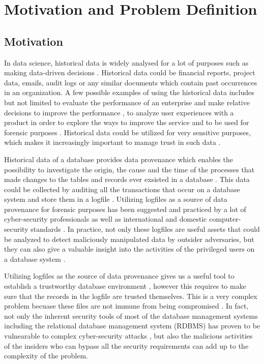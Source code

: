 \chapter{Motivation and Problem Definition} \label{ch:motivation}

	\section{Motivation} \label{sec:motivation}
		In data science, historical data is widely analysed for a lot of purposes such as making data-driven decisions \cite{rose2016datascience}. Historical data could be financial reports, project data, emails, audit logs or any similar documents which contain past occurrences in an organization. A few possible examples of using the historical data includes but not limited to evaluate the performance of an enterprise and make relative decisions to improve the performance \cite{ghasemaghaei2015impactsOB}, to analyze user experiences with a product in order to explore the ways to improve the service \cite{klein2013analysis} and to be used for forensic purposes \cite{wagner2018detect}. Historical data could be utilized for very sensitive purposes, which makes it increasingly important to manage trust in such data \cite{jain2013trustworthy}.

		Historical data of a database provides data provenance which enables the possibility to investigate the origin, the cause and the time of the processes that made changes to the tables and records ever exsisted in a database \cite{cheney2009provenance}. This data could be collected by auditing all the transactions that occur on a database system and store them in a logfile \cite{ghoshal2013provenance}. Utilizing logfiles as a source of data provenance for forensic purposes has been suggested and practiced by a lot of cyber-security professionals \cite{marty2011cloud}\cite{Patrascu2015logging}\cite{wagner2018detect}\cite{sinha2014continuous} as well as international and domestic computer-security standards \cite{ehealth3542}\cite{NIST2006}\cite{UBC2014} \cite{USDoD1985}. In practice, not only these logfiles are useful assets that could be analyzed to detect maliciously manipulated data by outsider adversaries, but they can also give a valuable insight into the activities of the privileged users on a database system \cite{sinha2014continuous}.

		Utilizing logfiles as the source of data provenance gives us a useful tool to establish a trustworthy database environment \cite{viglas2013DataProvenance}, however this requires to make sure that the records in the logfile are trusted themselves\cite{Dai2008anapproach}. This is a very complex problem becuase these files are not immune from being compromised \cite{wagner2018detect}\cite{lin2015secure}. In fact, not only the inherent security tools of most of the database management systems including the relational database management system (RDBMS) has proven to be vulnearable to complex cyber-security attacks \cite{wanger2017carving}, but also the malicious activities of the insiders who can bypass all the security requirements can add up to the complexity of the problem.

